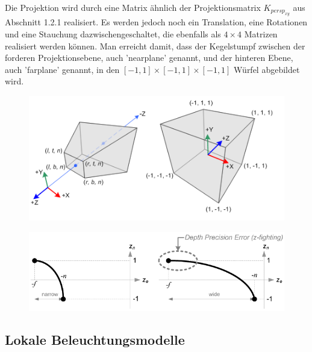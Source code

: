 Die Projektion wird durch eine Matrix  ähnlich der Projektionsmatrix $K_{persp_{xy}}$ aus Abschnitt 1.2.1 realisiert.
Es werden jedoch noch ein Translation, eine Rotationen und eine Stauchung dazwischengeschaltet, die ebenfalls als $4 \times 4$ Matrizen realisiert werden können.  Man erreicht damit, dass der Kegelstumpf zwischen der forderen Projektionsebene, auch 'nearplane' genannt,  und der hinteren Ebene, auch 'farplane' genannt, in den $[-1,1] \times [-1,1] \times [-1,1] $ Würfel abgebildet wird.   
\begin{figure}[H]
    \centering
    \includegraphics[width=1.0\textwidth]{images/gl_projectionmatrix01.png}
\end{figure}



\begin{Definition}[z-Buffer]
\end{Definition}


\begin{Algorithmus}
\end{Algorithmus}



\begin{figure}[H]
    \centering
    \includegraphics[width=1.0\textwidth]{images/gl_projectionmatrix_zbuffer_1.png}
\end{figure}



\subsection{Lokale Beleuchtungsmodelle}
